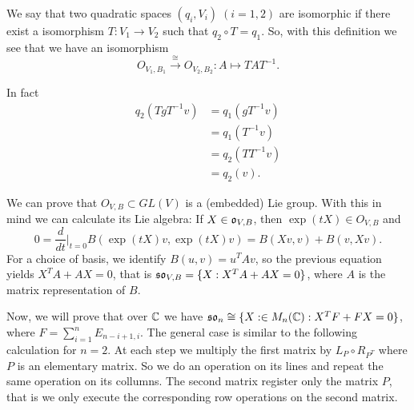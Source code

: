 We say that two quadratic spaces $(q_i, V_i)\;(i=1,2)$ are isomorphic if there exist a isomorphism $T:V_1\to V_2$ such that 
$q_2\circ T = q_1$.  So, with this definition we see that we have an isomorphism
\begin{equation}
    O_{V_1,B_1}\overset{\cong}{\longrightarrow} O_{V_2,B_2}: A\mapsto TAT^{-1}.
\end{equation}

In fact 
\begin{equation}
    \begin{split}
        q_2(TgT^{-1}v) &= q_1(gT^{-1}v)\\
        &= q_1(T^{-1}v)\\
        &=q_2(TT^{-1}v)\\
        &=q_2(v).
    \end{split}
\end{equation}

We can prove that $O_{V,B}\subset GL(V)$ is a (embedded) Lie group. With this in mind we can calculate its Lie algebra: If 
$X\in\mathfrak{o}_{V,B}$, then $\exp(tX)\in O_{V,B}$ and 
\begin{equation}
    0 = \frac{d}{dt}\bigl|_{t=0}B(\exp(tX)v,\exp(tX)v)= B(Xv,v)+B(v,Xv).
\end{equation}
For a choice of basis, we identify $B(u,v)=u^TAv$, so the previous equation yields $X^TA+AX=0$, that is 
$\mathfrak{so}_{V,B}=\{X:X^TA+AX=0\}$, where $A$ is the matrix representation of $B$. \par 

Now, we will prove that over $\mathbb{C}$ we have $\mathfrak{so}_{n}\cong \{X:\in M_{n}(\mathbb{C}): X^TF+F X=0\}$, where 
$F = \sum_{i=1}^{n}E_{n-i+1,i}$. The general case is similar to the following calculation for $n=2$. At each step we 
multiply the first matrix by $L_P\circ R_{P^T}$ where $P$ is an elementary matrix. So we do an operation on its lines and repeat the same operation on its collumns. 
The second matrix register only the matrix $P$, that is we only execute the corresponding row operations on the second matrix.

